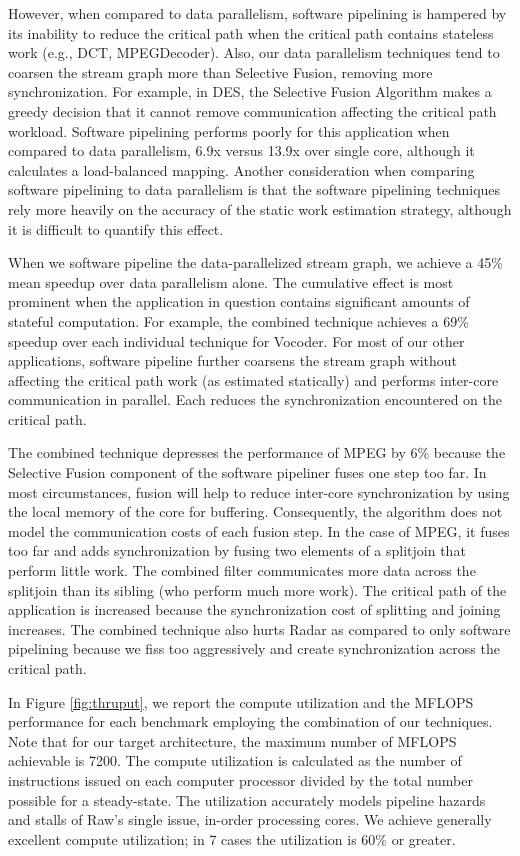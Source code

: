 However, when compared to data parallelism, software pipelining is
hampered by its inability to reduce the critical path when the
critical path contains stateless work (e.g., DCT, MPEGDecoder).  Also,
our data parallelism techniques tend to coarsen the stream graph more
than Selective Fusion, removing more synchronization.  For example, in
DES, the Selective Fusion Algorithm makes a greedy decision that it
cannot remove communication affecting the critical path workload.
Software pipelining performs poorly for this application when compared
to data parallelism, 6.9x versus 13.9x over single core, although it
calculates a load-balanced mapping.  Another consideration when
comparing software pipelining to data parallelism is that the software
pipelining techniques rely more heavily on the accuracy of the static
work estimation strategy, although it is difficult to quantify this
effect.

When we software pipeline the data-parallelized stream graph, we
achieve a 45\% mean speedup over data parallelism alone. The
cumulative effect is most prominent when the application in question
contains significant amounts of stateful computation.  For example,
the combined technique achieves a 69\% speedup over each individual
technique for Vocoder. For most of our other applications, software
pipeline further coarsens the stream graph without affecting the
critical path work (as estimated statically) and performs inter-core
communication in parallel.  Each reduces the synchronization
encountered on the critical path.

The combined technique depresses the performance of MPEG by 6\%
because the Selective Fusion component of the software pipeliner fuses
one step too far.  In most circumstances, fusion will help to reduce
inter-core synchronization by using the local memory of the core for
buffering. Consequently, the algorithm does not model the
communication costs of each fusion step. In the case of MPEG, it fuses
too far and adds synchronization by fusing two elements of a splitjoin
that perform little work.  The combined filter communicates more data
across the splitjoin than its sibling (who perform much more work).
The critical path of the application is increased because the
synchronization cost of splitting and joining increases.  The combined
technique also hurts Radar as compared to only software pipelining
because we fiss too aggressively and create synchronization across the
critical path.

In Figure \ref{fig:thruput}, we report the compute utilization and the
MFLOPS performance for each benchmark employing the combination of our
techniques. Note that for our target architecture, the maximum number
of MFLOPS achievable is 7200.  The compute utilization is calculated
as the number of instructions issued on each computer processor
divided by the total number possible for a steady-state.  The
utilization accurately models pipeline hazards and stalls of Raw's
single issue, in-order processing cores.  We achieve generally
excellent compute utilization; in 7 cases the utilization is 60\% or
greater.


